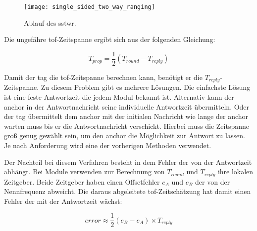 \begin{figure}
	\centering
	\texttt{[image: single\_sided\_two\_way\_ranging]}
	\caption{Ablauf des \acrlong{sstwr}.}
	\label{fig:single_sided_two_way_ranging}
\end{figure}

Die ungefähre \Gls{tof}-Zeitspanne ergibt sich aus der folgenden Gleichung:

\begin{equation}
T_{prop}=\frac{1}{2}\left(T_{round}-T_{reply}\right)
\end{equation}

Damit der \Gls{tag} die \Gls{tof}-Zeitspanne berechnen kann, benötigt er die $T_{reply}$-Zeitspanne. Zu diesem Problem gibt es mehrere Lösungen. Die einfachste Lösung ist eine feste Antwortzeit die jedem Modul bekannt ist. Alternativ kann der \Gls{anchor} in der Antwortnachricht seine individuelle Antwortzeit übermitteln. Oder der \Gls{tag} übermittelt dem \Gls{anchor} mit der initialen Nachricht wie lange der \Gls{anchor} warten muss bis er die Antwortnachricht verschickt. Hierbei muss die Zeitspanne groß genug gewählt sein, um den \Gls{anchor} die Möglichkeit zur Antwort zu lassen. Je nach Anforderung wird eine der vorherigen Methoden verwendet.

Der Nachteil bei diesem Verfahren besteht in dem Fehler der von der Antwortzeit abhängt. Bei Module verwenden zur Berechnung von $T_{round}$ und $T_{reply}$ ihre lokalen Zeitgeber. Beide Zeitgeber haben einen Offsetfehler $e_{A}$ und $e_{B}$ der von der Nennfrequenz abweicht. Die daraus abgeleitete \Gls{tof}-Zeitschätzung hat damit einen Fehler der mit der Antwortzeit wächst:

\begin{equation}
error\approx\frac{1}{2}\left(e_B-e_A\right)\times T_{reply}
\end{equation}


%
%
